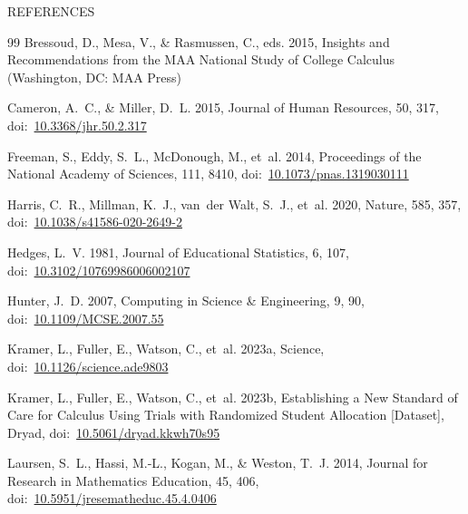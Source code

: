 \documentclass[10pt,twocolumn,letterpaper]{article}
\begin{document}
\clearpage
\twocolumn
\begin{center}REFERENCES\end{center}
\vspace{4pt}
{\footnotesize
\renewcommand{\section}[2]{}%
\begin{thebibliography}{99}
\setlength{\itemsep}{1pt}
Bressoud, D., Mesa, V., \& Rasmussen, C., eds. 2015, Insights and Recommendations from the MAA National Study of College Calculus (Washington, DC: MAA Press)

Cameron, A.~C., \& Miller, D.~L. 2015, Journal of Human Resources, 50, 317, doi:~\href{https://doi.org/10.3368/jhr.50.2.317}{10.3368/jhr.50.2.317}

Freeman, S., Eddy, S.~L., McDonough, M., et~al. 2014, Proceedings of the National Academy of Sciences, 111, 8410, doi:~\href{https://doi.org/10.1073/pnas.1319030111}{10.1073/pnas.1319030111}

Harris, C.~R., Millman, K.~J., van~der Walt, S.~J., et~al. 2020, Nature, 585, 357, doi:~\href{https://doi.org/10.1038/s41586-020-2649-2}{10.1038/s41586-020-2649-2}

Hedges, L.~V. 1981, Journal of Educational Statistics, 6, 107, doi:~\href{https://doi.org/10.3102/10769986006002107}{10.3102/10769986006002107}

Hunter, J.~D. 2007, Computing in Science \& Engineering, 9, 90, doi:~\href{https://doi.org/10.1109/MCSE.2007.55}{10.1109/MCSE.2007.55}

Kramer, L., Fuller, E., Watson, C., et~al. 2023a, Science, doi:~\href{https://doi.org/10.1126/science.ade9803}{10.1126/science.ade9803}

Kramer, L., Fuller, E., Watson, C., et~al. 2023b, Establishing a New Standard of Care for Calculus Using Trials with Randomized Student Allocation [Dataset], Dryad, doi:~\href{https://doi.org/10.5061/dryad.kkwh70s95}{10.5061/dryad.kkwh70s95}

Laursen, S.~L., Hassi, M.-L., Kogan, M., \& Weston, T.~J. 2014, Journal for Research in Mathematics Education, 45, 406, doi:~\href{https://doi.org/10.5951/jresematheduc.45.4.0406}{10.5951/jresematheduc.45.4.0406}


\end{thebibliography}}
\end{document}
